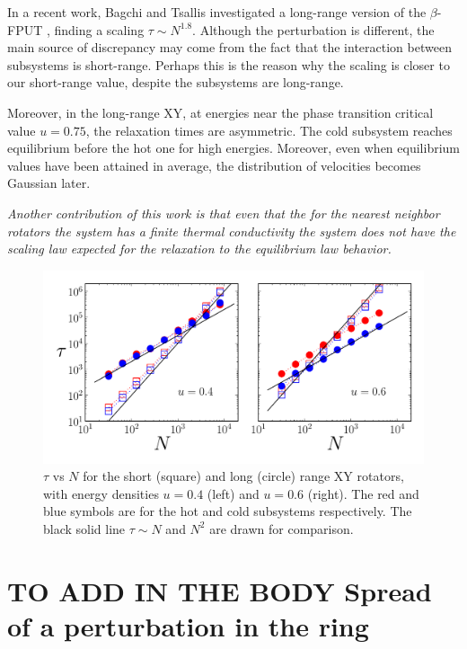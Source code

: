 \documentclass[aps,pre,showpacs,twocolumn,superscriptaddress,floatfix]{revtex4-1}
\begin{document}
{In a recent work, Bagchi and Tsallis investigated a long-range version of the $\beta$-FPUT
\cite{BagchiTsallis2017}, finding a scaling $\tau \sim N^{1.8}$. 
Although the perturbation is different, the main source of discrepancy may come from the fact 
that the interaction between subsystems is short-range. Perhaps this is the reason 
why the scaling is closer to our short-range value, despite the subsystems are long-range. 

 
Moreover, in the long-range XY, at energies  near  the  phase 
transition critical value $u=0.75$, the relaxation times are asymmetric. 
%
The cold subsystem reaches equilibrium before the hot one for high energies. 
Moreover, even when  equilibrium  values have been attained in average, the distribution 
of velocities becomes Gaussian later.  

{\em 
Another contribution of this work is that even that the for the nearest neighbor rotators 
the system has a finite thermal conductivity the system does not have the scaling law expected 
for the relaxation to the equilibrium
law behavior.
 
}

\begin{figure}[h]
 \centering
 \includegraphics[width=1.0\linewidth]{./PlotTaus1over3_XY_HMF.pdf}
 \caption{$\tau$ vs $N$ for the short (square) and long (circle) range XY rotators, 
with energy densities $u=0.4$ (left) and $u=0.6$ (right). 
The red and blue symbols are for the hot and cold subsystems respectively. 
The black  solid line  $\tau \sim N$ and $N^2$ are drawn for comparison.}
 \label{fig:Taus_XY_HMF}
\end{figure}



\section{TO ADD IN THE BODY Spread of a perturbation in the ring}

}
\end{document}

